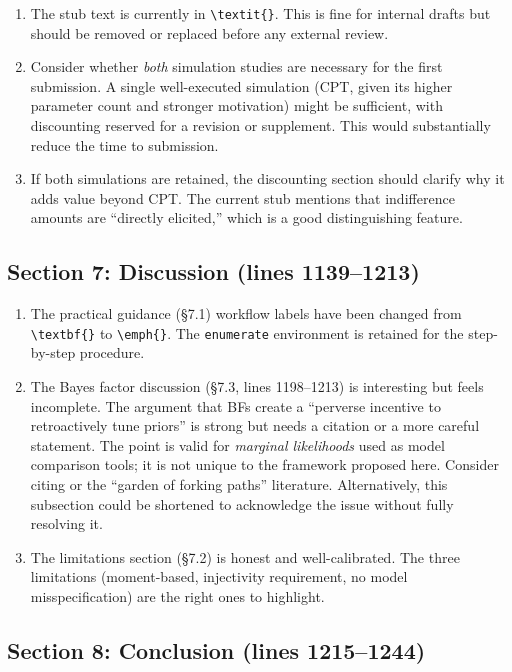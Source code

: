 \documentclass[12pt,a4paper]{article}
\begin{document}
\begin{enumerate}[label=(\alph*)]
  \item The stub text is currently in \verb|\textit{}|. This is fine for
    internal drafts but should be removed or replaced before any external
    review.
  \item Consider whether \emph{both} simulation studies are necessary for the
    first submission. A single well-executed simulation (CPT, given its higher
    parameter count and stronger motivation) might be sufficient, with
    discounting reserved for a revision or supplement. This would substantially
    reduce the time to submission.
  \item If both simulations are retained, the discounting section should clarify
    why it adds value beyond CPT. The current stub mentions that indifference
    amounts are ``directly elicited,'' which is a good distinguishing feature.
\end{enumerate}


\subsection{Section 7: Discussion (lines 1139--1213)}

\begin{enumerate}[label=(\alph*)]
  \item[{[x]}] The practical guidance (\S7.1) workflow labels have been changed
    from \verb|\textbf{}| to \verb|\emph{}|. The \verb|enumerate| environment
    is retained for the step-by-step procedure.
  \item The Bayes factor discussion (\S7.3, lines 1198--1213) is interesting
    but feels incomplete. The argument that BFs create a ``perverse incentive to
    retroactively tune priors'' is strong but needs a citation or a more careful
    statement. The point is valid for \emph{marginal likelihoods} used as model
    comparison tools; it is not unique to the framework proposed here.
    Consider citing \textcite{Gelman2013} or the ``garden of forking paths''
    literature. Alternatively, this subsection could be shortened to
    acknowledge the issue without fully resolving it.
  \item The limitations section (\S7.2) is honest and well-calibrated. The three
    limitations (moment-based, injectivity requirement, no model
    misspecification) are the right ones to highlight.
\end{enumerate}


\subsection{Section 8: Conclusion (lines 1215--1244)}
\end{document}
